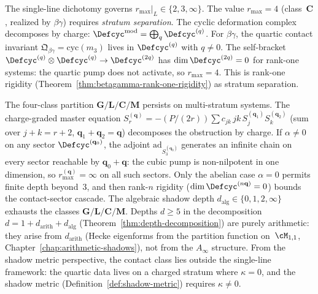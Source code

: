 \begin{remark}
\label{rem:contact-stratum-separation}
The single-line dichotomy governs
$r_{\max}|_L \in \{2,3,\infty\}$.  The value
$r_{\max} = 4$ (class~$\mathbf{C}$, realized by $\beta\gamma$)
requires \emph{stratum separation}.
The cyclic deformation complex decomposes by charge:
$\Defcyc^{\mathrm{mod}} = \bigoplus_{q}\Defcyc^{(q)}$.
For $\beta\gamma$, the quartic contact invariant
$\mathfrak{Q}_{\beta\gamma} = \mathrm{cyc}(m_3)$
lives in $\Defcyc^{(q)}$ with $q \neq 0$.
The self-bracket
$\Defcyc^{(q)} \otimes \Defcyc^{(q)} \to \Defcyc^{(2q)}$
has $\dim \Defcyc^{(2q)} = 0$ for rank-one systems:
the quartic pump does not activate, so $r_{\max} = 4$.
This is rank-one rigidity
(Theorem~\ref{thm:betagamma-rank-one-rigidity})
as stratum separation.

The four-class partition
$\mathbf{G}/\mathbf{L}/\mathbf{C}/\mathbf{M}$
persists on multi-stratum systems.
The charge-graded master equation
$S_r^{(\mathbf{q})} =
-(P/(2r))\sum c_{jk}\,jk\,
S_j^{(\mathbf{q}_1)} S_k^{(\mathbf{q}_2)}$
(sum over $j+k=r{+}2$, $\mathbf{q}_1{+}\mathbf{q}_2 = \mathbf{q}$)
decomposes the obstruction by charge.
If $\alpha \neq 0$ on any sector $\Defcyc^{(\mathbf{q}_0)}$,
the adjoint $\mathrm{ad}_{S_3^{(\mathbf{q}_0)}}$ generates
an infinite chain on every sector reachable by
$\mathbf{q}_0 + \mathbf{q}$: the cubic pump is
non-nilpotent in one dimension, so
$r_{\max}^{(\mathbf{q})} = \infty$ on all such sectors.
Only the abelian case $\alpha = 0$ permits finite depth
beyond~$3$, and then rank-$n$ rigidity
($\dim \Defcyc^{(n\mathbf{q})} = 0$)
bounds the contact-sector cascade.
The algebraic shadow depth
$d_{\mathrm{alg}} \in \{0, 1, 2, \infty\}$
exhausts the classes $\mathbf{G}/\mathbf{L}/\mathbf{C}/\mathbf{M}$.
Depths $d \geq 5$ in the decomposition
$d = 1 + d_{\mathrm{arith}} + d_{\mathrm{alg}}$
(Theorem~\ref{thm:depth-decomposition})
are purely arithmetic: they arise from $d_{\mathrm{arith}}$
(Hecke eigenforms from the partition function on~$\cM_{1,1}$,
Chapter~\ref{chap:arithmetic-shadows}), not from the
$A_\infty$ structure.
From the shadow metric perspective, the contact class lies outside the single-line framework: the quartic data lives on a charged stratum where $\kappa = 0$, and the shadow metric (Definition~\ref{def:shadow-metric}) requires $\kappa \neq 0$.
\end{remark}

